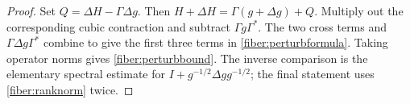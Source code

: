 \begin{proof}
Set \(Q=\Delta H-\Gamma\Delta g\).  Then
\(H+\Delta H=\Gamma(g+\Delta g)+Q\).  Multiply out the corresponding
cubic contraction and subtract \(\Gamma g\Gamma^*\).  The two cross
terms and \(\Gamma\Delta g\Gamma^*\) combine to give the first three
terms in \eqref{fiber:perturbformula}.  Taking operator norms gives
\eqref{fiber:perturbbound}.  The inverse comparison is the elementary
spectral estimate for \(I+g^{-1/2}\Delta g g^{-1/2}\); the final statement
uses \eqref{fiber:ranknorm} twice.
\end{proof}
